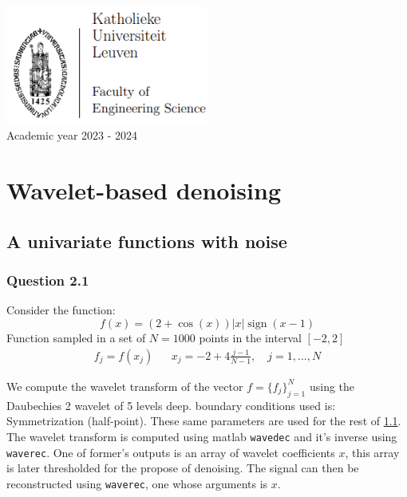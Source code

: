 \documentclass[a4paper]{article}
\DeclareMathOperator*{\sign}{sign}
\begin{document}
\begin{titlepage}
\begin{center}
			\includegraphics[width=0.5\textwidth]{Images/KUL_Eng_logo.png}\\
			{\Large{Academic year 2023 - 2024}}
			
		\end{center}
	\end{titlepage}
	
	\newpage
	
	\tableofcontents
	
	\newpage

    \section{Wavelet-based denoising}
 
	\subsection{A univariate functions with noise} \label{subsec:UniVariate}

    \subsubsection{Question 2.1}

	Consider the function:
    \begin{equation} \label{eq:func}
	f(x) = (2+\cos{(x)}) |x| \sign{(x-1)}
	\end{equation}
    Function sampled in a set of $N=1000$ points in the interval $[-2,2]$
    \begin{align*}
    	f_j = f(x_j) && x_j = -2 + 4\frac{j-1}{N-1}, \quad j=1,\ldots,N
    \end{align*}
    
    We compute the wavelet transform of the vector $f = \{f_j\}_{j=1}^N$ using the Daubechies 2 wavelet of 5 levels deep. boundary conditions used is: Symmetrization (half-point). These same parameters are used for the rest of \cref{subsec:UniVariate}. The wavelet transform is computed using matlab \texttt{wavedec} and it's inverse using \texttt{waverec}. One of former's outputs is an array of wavelet coefficients $x$, this array is later thresholded for the propose of denoising. The signal can then be reconstructed using \texttt{waverec}, one whose arguments is $x$.
    
\end{document}
